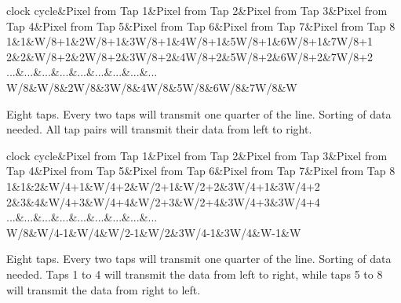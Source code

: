 \begin{Desc}
\begin{description}
\begin{TabularC}{9}
\hline
clock cycle&Pixel from Tap 1&Pixel from Tap 2&Pixel from Tap 3&Pixel from Tap 4&Pixel from Tap 5&Pixel from Tap 6&Pixel from Tap 7&Pixel from Tap 8 \\
1&1&W/8+1&2\+W/8+1&3\+W/8+1&4\+W/8+1&5\+W/8+1&6\+W/8+1&7\+W/8+1 \\
2&2&W/8+2&2\+W/8+2&3\+W/8+2&4\+W/8+2&5\+W/8+2&6\+W/8+2&7\+W/8+2 \\
...&...&...&...&...&...&...&...&... \\
W/8&W/8&2\+W/8&3\+W/8&4\+W/8&5\+W/8&6\+W/8&7\+W/8&W \\
\end{TabularC}
\item[{\em 
\hypertarget{group___device_specific_interface_gga25ba65893f1ee0e7de99cb51bb858d99a203dd2469470f2551ce3904eb6672a4c}{cltxg4\+X2}\label{group___device_specific_interface_gga25ba65893f1ee0e7de99cb51bb858d99a203dd2469470f2551ce3904eb6672a4c}
}]Eight taps. Every two taps will transmit one quarter of the line. Sorting of data needed. All tap pairs will transmit their data from left to right.

\begin{TabularC}{9}
\hline
clock cycle&Pixel from Tap 1&Pixel from Tap 2&Pixel from Tap 3&Pixel from Tap 4&Pixel from Tap 5&Pixel from Tap 6&Pixel from Tap 7&Pixel from Tap 8 \\
1&1&2&W/4+1&W/4+2&W/2+1&W/2+2&3\+W/4+1&3\+W/4+2 \\
2&3&4&W/4+3&W/4+4&W/2+3&W/2+4&3\+W/4+3&3\+W/4+4 \\
...&...&...&...&...&...&...&...&... \\
W/8&W/4-\/1&W/4&W/2-\/1&W/2&3\+W/4-\/1&3\+W/4&W-\/1&W \\
\end{TabularC}
\item[{\em 
\hypertarget{group___device_specific_interface_gga25ba65893f1ee0e7de99cb51bb858d99a1862ff0e481594cb4337c30ed123c13a}{cltxg4\+X2\+E}\label{group___device_specific_interface_gga25ba65893f1ee0e7de99cb51bb858d99a1862ff0e481594cb4337c30ed123c13a}
}]Eight taps. Every two taps will transmit one quarter of the line. Sorting of data needed. Taps 1 to 4 will transmit the data from left to right, while taps 5 to 8 will transmit the data from right to left.


\end{description}
\end{Desc}
